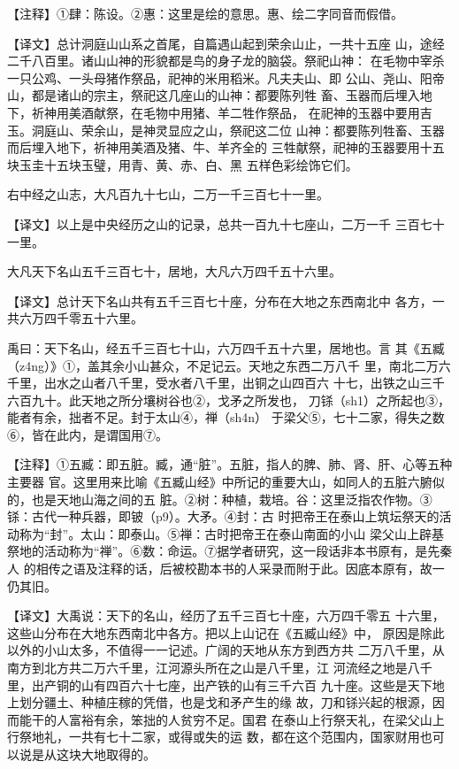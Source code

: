\documentclass[a4paper,12pt,UTF8,twoside]{ctexbook}
\begin{document}
【注释】①肆：陈设。②惠：这里是绘的意思。惠、绘二字同音而假借。

【译文】总计洞庭山山系之首尾，自篇遇山起到荣余山止，一共十五座 山，途经二千八百里。诸山山神的形貌都是鸟的身子龙的脑袋。祭祀山神： 在毛物中宰杀一只公鸡、一头母猪作祭品，祀神的米用稻米。凡夫夫山、即 公山、尧山、阳帝山，都是诸山的宗主，祭祀这几座山的山神：都要陈列牲 畜、玉器而后埋入地下，祈神用美酒献祭，在毛物中用猪、羊二牲作祭品， 在祀神的玉器中要用吉玉。洞庭山、荣余山，是神灵显应之山，祭祀这二位 山神：都要陈列牲畜、玉器而后埋入地下，祈神用美酒及猪、牛、羊齐全的 三牲献祭，祀神的玉器要用十五块玉圭十五块玉璧，用青、黄、赤、白、黑 五样色彩绘饰它们。

右中经之山志，大凡百九十七山，二万一千三百七十一里。

【译文】以上是中央经历之山的记录，总共一百九十七座山，二万一千 三百七十一里。

大凡天下名山五千三百七十，居地，大凡六万四千五十六里。

【译文】总计天下名山共有五千三百七十座，分布在大地之东西南北中 各方，一共六万四千零五十六里。

禹曰：天下名山，经五千三百七十山，六万四千五十六里，居地也。言 其《五臧（z4ng）》①，盖其余小山甚众，不足记云。天地之东西二万八千 里，南北二万六千里，出水之山者八千里，受水者八千里，出铜之山四百六 十七，出铁之山三千六百九十。此天地之所分壤树谷也②，戈矛之所发也， 刀铩（sh1）之所起也③，能者有余，拙者不足。封于太山④，禅（sh4n） 于梁父⑤，七十二家，得失之数⑥，皆在此内，是谓国用⑦。

【注释】①五臧：即五脏。臧，通“脏”。五脏，指人的脾、肺、肾、肝、心等五种主要器 官。这里用来比喻《五臧山经》中所记的重要大山，如同人的五脏六腑似的，也是天地山海之间的五 脏。②树：种植，栽培。谷：这里泛指农作物。③铩：古代一种兵器，即铍（p9）。大矛。④封：古 时把帝王在泰山上筑坛祭天的活动称为“封”。太山：即泰山。⑤禅：古时把帝王在泰山南面的小山 梁父山上辟基祭地的活动称为“禅”。⑥数：命运。⑦据学者研究，这一段话非本书原有，是先秦人 的相传之语及注释的话，后被校勘本书的人采录而附于此。因底本原有，故一仍其旧。

【译文】大禹说：天下的名山，经历了五千三百七十座，六万四千零五 十六里，这些山分布在大地东西南北中各方。把以上山记在《五臧山经》中， 原因是除此以外的小山太多，不值得一一记述。广阔的天地从东方到西方共 二万八千里，从南方到北方共二万六千里，江河源头所在之山是八千里，江 河流经之地是八千里，出产铜的山有四百六十七座，出产铁的山有三千六百 九十座。这些是天下地上划分疆土、种植庄稼的凭借，也是戈和矛产生的缘 故，刀和铩兴起的根源，因而能干的人富裕有余，笨拙的人贫穷不足。国君 在泰山上行祭天礼，在梁父山上行祭地礼，一共有七十二家，或得或失的运 数，都在这个范围内，国家财用也可以说是从这块大地取得的。
\end{document}
